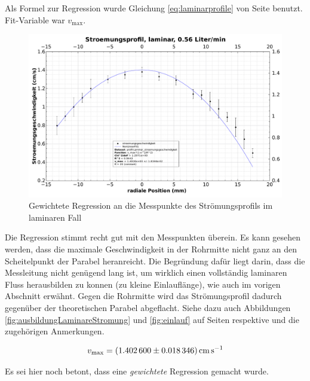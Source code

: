 \clearpage
\begin{samepage}
Als Formel  zur Regression  wurde Gleichung \ref{eq:laminarprofile}  von Seite
\pageref{eq:laminarprofile} benutzt. Fit-Variable war $v_{\mathrm{max}}$.

\begin{figure}[h!t]
    \centering
    \includegraphics[width=\textwidth]{images/profil-laminar.pdf}
    \caption{Gewichtete Regression an die Messpunkte des Str\"omungsprofils im laminaren Fall}
    \label{fig:profile:laminar}
\end{figure}

Die  Regression  stimmt  recht  gut mit  den  Messpunkten  \"uberein. Es  kann
gesehen  werden, dass  die  maximale Geschwindigkeit  in  der Rohrmitte  nicht
ganz an  den Scheitelpunkt  der Parabel heranreicht. Die  Begr\"undung daf\"ur
liegt  darin, dass  die Messleitung  nicht  gen\"ugend lang  ist, um  wirklich
einen  vollst\"andig  laminaren  Fluss   herausbilden  zu  konnen  (zu  kleine
Einlaufl\"ange), wie auch im  vorigen Abschnitt erw\"ahnt. Gegen die Rohrmitte
wird  das Str\"omungsprofil  dadurch   gegen\"uber  der theoretischen  Parabel
abgeflacht. Siehe  dazu auch  Abbildungen \ref{fig:ausbildungLaminareStromung}
und  \ref{fig:einlauf}   auf  Seiten  \pageref{fig:ausbildungLaminareStromung}
respektive \pageref{fig:einlauf} und die zugeh\"origen Anmerkungen.

\begin{equation}
    \label{eq:profile:laminar:regression:results:vmax}
    v_{\mathrm{max}} = \SI{1.4026 \pm 0.018346}{\centi\meter\per\second}
\end{equation}

Es sei hier noch betont, dass eine \emph{gewichtete} Regression gemacht wurde.
\end{samepage}

